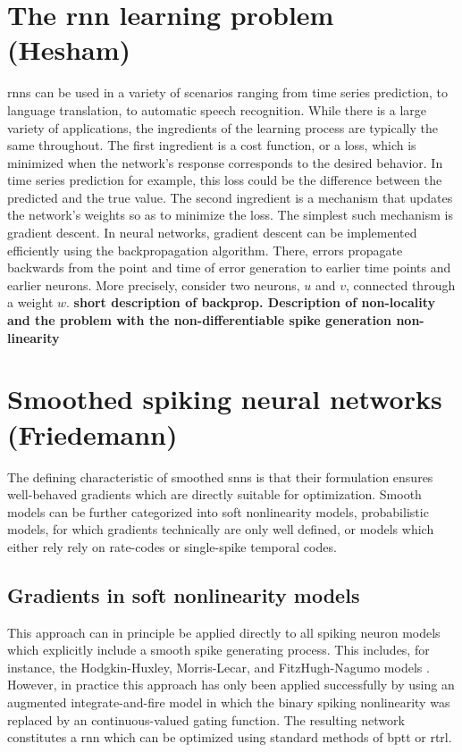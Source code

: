 \documentclass[journal,onecolumn,11pt]{IEEEtran}
\begin{document}
\section{The \gls{rnn} learning problem (Hesham)}
\glspl{rnn} can be used in a variety of scenarios ranging from time series prediction, to language translation, to automatic speech recognition. While there is a large variety of applications, the ingredients of the learning process are typically the same throughout. The first ingredient is a cost function, or a loss, which is minimized when the network's response corresponds to the desired behavior. In time series prediction for example, this loss could be the difference between the predicted and the true value. The second ingredient is a mechanism that updates the network's weights so as to minimize the loss. The simplest such mechanism is gradient descent. In neural networks, gradient descent can be implemented efficiently using the backpropagation algorithm.  There, errors propagate backwards from the point and time of error generation to earlier time points and earlier neurons. More precisely, consider two neurons, $u$ and $v$, connected through a weight $w$.
{\bf short description of backprop. Description of non-locality and the problem with the non-differentiable spike generation non-linearity}



\section{Smoothed spiking neural networks (Friedemann)}

The defining characteristic of smoothed \glspl{snn} is that their formulation
ensures well-behaved gradients which are directly suitable for optimization.
Smooth models can be further categorized into soft nonlinearity models,  
probabilistic models, for which gradients technically are only
well defined, or models which either rely rely on rate-codes or
single-spike temporal codes.  


\subsection{Gradients in soft nonlinearity models}

This approach can in principle be applied
directly to all spiking neuron models which explicitly include a smooth spike
generating process. This includes, for instance,  the Hodgkin-Huxley,
Morris-Lecar, and FitzHugh-Nagumo models \cite{Gerstner_etal14_neurdyna}.
However, in practice this approach has only been applied successfully by
\cite{Huh_Sejnowski17_graddesc} using an augmented integrate-and-fire model in
which the binary spiking nonlinearity was replaced by an continuous-valued
gating function.  The resulting network constitutes a \gls{rnn} which can be
optimized using standard methods of \gls{bptt} or \gls{rtrl}.  
\end{document}
